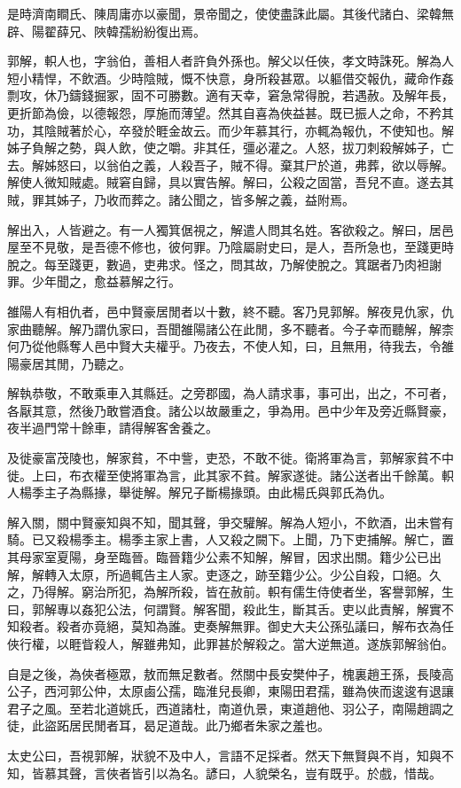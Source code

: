 是時濟南瞷氏、陳周庸亦以豪聞，景帝聞之，使使盡誅此屬。其後代諸白、梁韓無辟、陽翟薛兄、陜韓孺紛紛復出焉。

郭解，軹人也，字翁伯，善相人者許負外孫也。解父以任俠，孝文時誅死。解為人短小精悍，不飲酒。少時陰賊，慨不快意，身所殺甚眾。以軀借交報仇，藏命作姦剽攻，休乃鑄錢掘冢，固不可勝數。適有天幸，窘急常得脫，若遇赦。及解年長，更折節為儉，以德報怨，厚施而薄望。然其自喜為俠益甚。既已振人之命，不矜其功，其陰賊著於心，卒發於睚金故云。而少年慕其行，亦輒為報仇，不使知也。解姊子負解之勢，與人飲，使之嚼。非其任，彊必灌之。人怒，拔刀刺殺解姊子，亡去。解姊怒曰，以翁伯之義，人殺吾子，賊不得。棄其尸於道，弗葬，欲以辱解。解使人微知賊處。賊窘自歸，具以實告解。解曰，公殺之固當，吾兒不直。遂去其賊，罪其姊子，乃收而葬之。諸公聞之，皆多解之義，益附焉。

解出入，人皆避之。有一人獨箕倨視之，解遣人問其名姓。客欲殺之。解曰，居邑屋至不見敬，是吾德不修也，彼何罪。乃陰屬尉史曰，是人，吾所急也，至踐更時脫之。每至踐更，數過，吏弗求。怪之，問其故，乃解使脫之。箕踞者乃肉袒謝罪。少年聞之，愈益慕解之行。

雒陽人有相仇者，邑中賢豪居閒者以十數，終不聽。客乃見郭解。解夜見仇家，仇家曲聽解。解乃謂仇家曰，吾聞雒陽諸公在此閒，多不聽者。今子幸而聽解，解柰何乃從他縣奪人邑中賢大夫權乎。乃夜去，不使人知，曰，且無用，待我去，令雒陽豪居其閒，乃聽之。

解執恭敬，不敢乘車入其縣廷。之旁郡國，為人請求事，事可出，出之，不可者，各厭其意，然後乃敢嘗酒食。諸公以故嚴重之，爭為用。邑中少年及旁近縣賢豪，夜半過門常十餘車，請得解客舍養之。

及徙豪富茂陵也，解家貧，不中訾，吏恐，不敢不徙。衛將軍為言，郭解家貧不中徙。上曰，布衣權至使將軍為言，此其家不貧。解家遂徙。諸公送者出千餘萬。軹人楊季主子為縣掾，舉徙解。解兄子斷楊掾頭。由此楊氏與郭氏為仇。

解入關，關中賢豪知與不知，聞其聲，爭交驩解。解為人短小，不飲酒，出未嘗有騎。已又殺楊季主。楊季主家上書，人又殺之闕下。上聞，乃下吏捕解。解亡，置其母家室夏陽，身至臨晉。臨晉籍少公素不知解，解冒，因求出關。籍少公已出解，解轉入太原，所過輒告主人家。吏逐之，跡至籍少公。少公自殺，口絕。久之，乃得解。窮治所犯，為解所殺，皆在赦前。軹有儒生侍使者坐，客譽郭解，生曰，郭解專以姦犯公法，何謂賢。解客聞，殺此生，斷其舌。吏以此責解，解實不知殺者。殺者亦竟絕，莫知為誰。吏奏解無罪。御史大夫公孫弘議曰，解布衣為任俠行權，以睚眥殺人，解雖弗知，此罪甚於解殺之。當大逆無道。遂族郭解翁伯。

自是之後，為俠者極眾，敖而無足數者。然關中長安樊仲子，槐裏趙王孫，長陵高公子，西河郭公仲，太原鹵公孺，臨淮兒長卿，東陽田君孺，雖為俠而逡逡有退讓君子之風。至若北道姚氏，西道諸杜，南道仇景，東道趙他、羽公子，南陽趙調之徒，此盜跖居民閒者耳，曷足道哉。此乃鄉者朱家之羞也。

太史公曰，吾視郭解，狀貌不及中人，言語不足採者。然天下無賢與不肖，知與不知，皆慕其聲，言俠者皆引以為名。諺曰，人貌榮名，豈有既乎。於戲，惜哉。